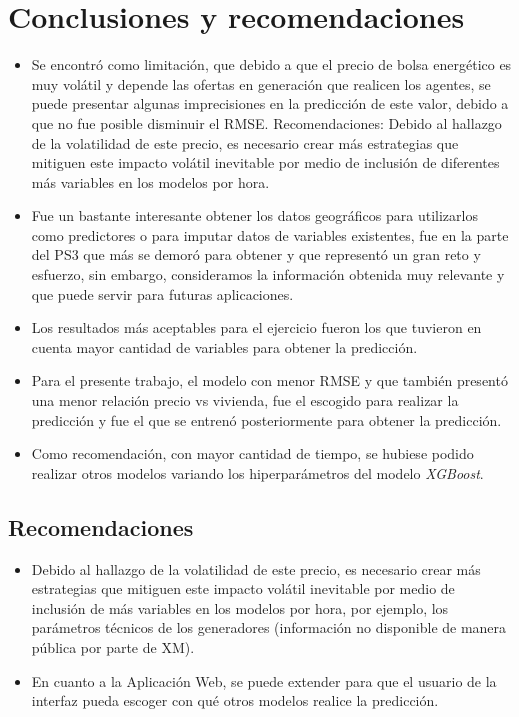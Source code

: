 \documentclass[conference, 10pt]{IEEEtran}
\begin{document}
\section{Conclusiones y recomendaciones}
\begin{itemize}
\item Se encontró como limitación, que debido  a que el precio de bolsa energético es muy volátil y depende las ofertas en generación que realicen los agentes, se puede presentar algunas imprecisiones en la predicción de este valor, debido a que no fue posible disminuir el RMSE. 
Recomendaciones: Debido al hallazgo de la volatilidad de este precio, es necesario crear más estrategias que mitiguen este impacto volátil inevitable por medio de inclusión de diferentes más variables en los modelos por hora.

\item Fue un bastante interesante obtener los datos geográficos para utilizarlos como predictores o para imputar datos de variables existentes, fue en la parte del PS3 que más se demoró para obtener y que representó un gran reto y esfuerzo, sin embargo, consideramos la información obtenida muy relevante y que puede servir para futuras aplicaciones.
\item Los resultados más aceptables para el ejercicio fueron los que tuvieron en cuenta mayor cantidad de variables para obtener la predicción.
\item Para el presente trabajo, el modelo con menor RMSE y que también presentó una menor relación precio vs vivienda, fue el escogido para realizar la predicción y fue el que se entrenó posteriormente para obtener la predicción.
\item Como recomendación, con mayor cantidad de tiempo, se hubiese podido realizar otros modelos variando los hiperparámetros del modelo \textit{XGBoost}. 

\end{itemize}

\subsection{Recomendaciones}
\begin{itemize}
\item Debido al hallazgo de la volatilidad de este precio, es necesario crear más estrategias que mitiguen este impacto volátil inevitable por medio de inclusión de más variables en los modelos por hora, por ejemplo, los parámetros técnicos de los generadores (información no disponible de manera pública por parte de XM).

\item En cuanto a la Aplicación Web, se puede extender para que el usuario de la interfaz pueda escoger con qué otros modelos realice la predicción.

\end{itemize}
\end{document}

